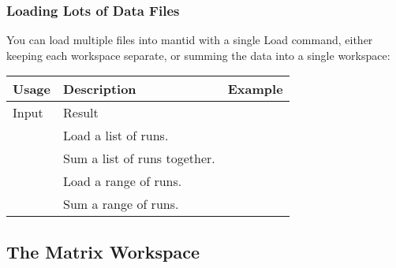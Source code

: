 \documentclass[letterpaper,10pt,english,openany]{sphinxmanual}
\begin{document}
\subsubsection{Loading Lots of Data Files}
\label{\detokenize{mantid_basic_course/loading_and_displaying_data/01_loading_data:loading-lots-of-data-files}}
You can load multiple files into mantid with a single Load command,
either keeping each workspace separate, or summing the data into a
single workspace:


\begin{savenotes}\sphinxattablestart
\centering
\begin{tabulary}{\linewidth}[t]{|T|T|T|}
\hline
\sphinxstyletheadfamily 
Usage
&\sphinxstyletheadfamily 
Description
&\sphinxstyletheadfamily 
Example
\\
\hline
Input
&
Result
&\\
\hline
\sphinxcode{\sphinxupquote{,}}
&
Load a list of runs.
&
\\
\hline
\sphinxcode{\sphinxupquote{+}}
&
Sum a list of runs together.
&
\\
\hline
\sphinxcode{\sphinxupquote{:}}
&
Load a range of runs.
&
\\
\hline
\sphinxcode{\sphinxupquote{-}}
&
Sum a range of runs.
&
\\
\hline
\end{tabulary}
\par
\sphinxattableend\end{savenotes}




\subsection{The Matrix Workspace}
\label{\detokenize{mantid_basic_course/loading_and_displaying_data/02_the_matrix_workspace:the-matrix-workspace}}\label{\detokenize{mantid_basic_course/loading_and_displaying_data/02_the_matrix_workspace:id1}}\label{\detokenize{mantid_basic_course/loading_and_displaying_data/02_the_matrix_workspace::doc}}
\end{document}
